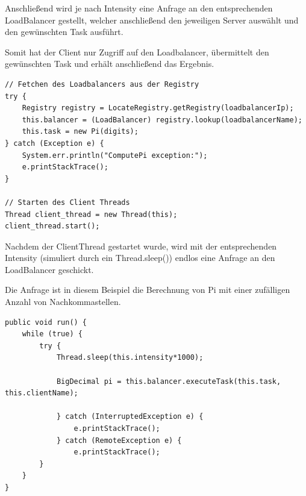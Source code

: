 Anschließend wird je nach Intensity eine Anfrage an den entsprechenden LoadBalancer gestellt, welcher anschließend den jeweiligen Server auswählt und den gewünschten Task ausführt.

Somit hat der Client nur Zugriff auf den Loadbalancer, übermittelt den gewünschten Task und erhält anschließend das Ergebnis.

\begin{lstlisting}[style=Java, caption=Clientseite RMI Connection]	
// Fetchen des Loadbalancers aus der Registry
try {
	Registry registry = LocateRegistry.getRegistry(loadbalancerIp);
	this.balancer = (LoadBalancer) registry.lookup(loadbalancerName);
	this.task = new Pi(digits);
} catch (Exception e) {
	System.err.println("ComputePi exception:");
	e.printStackTrace();
}

// Starten des Client Threads
Thread client_thread = new Thread(this);
client_thread.start();
\end{lstlisting}

Nachdem der ClientThread gestartet wurde, wird mit der entsprechenden Intensity (simuliert durch ein Thread.sleep()) endlos eine Anfrage an den LoadBalancer geschickt.

Die Anfrage ist in diesem Beispiel die Berechnung von Pi mit einer zufälligen Anzahl von Nachkommastellen.

\begin{lstlisting}[style=Java, caption=Client Thread]	
public void run() {
	while (true) {
		try {
			Thread.sleep(this.intensity*1000);
		
			BigDecimal pi = this.balancer.executeTask(this.task, this.clientName);
			
			} catch (InterruptedException e) {
				e.printStackTrace();
			} catch (RemoteException e) {
				e.printStackTrace();
		}
	}
}
\end{lstlisting}
